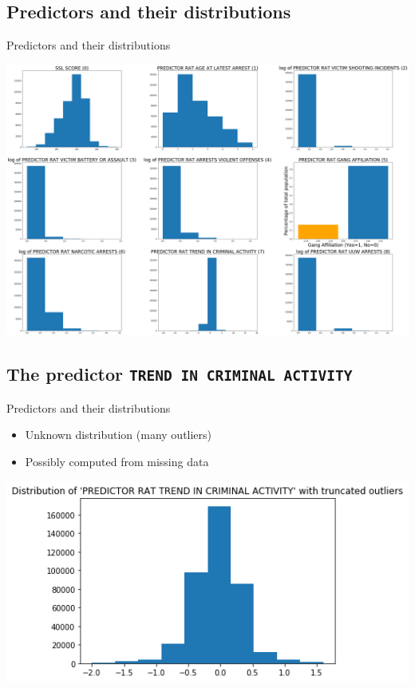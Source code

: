 \documentclass{beamer}
\begin{document}
\subsection{Predictors and their distributions}

\begin{frame}{Predictors and their distributions}
\begin{center}
\includegraphics[scale=.15]{distribs.png}
\end{center}
\end{frame}

\subsection{The predictor \texttt{TREND IN CRIMINAL ACTIVITY}}

\begin{frame}{Predictors and their distributions}
\begin{itemize}
    \item Unknown distribution (many outliers)
    \item Possibly computed from missing data
\end{itemize}

\begin{center}
\includegraphics[scale=.4]{trends.png}
\end{center}
\end{frame}
\end{document}
